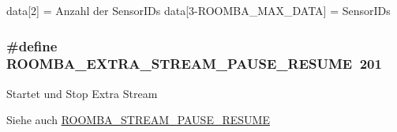 data\mbox{[}2\mbox{]} = Anzahl der Sensor\-I\-Ds data\mbox{[}3-\/\-R\-O\-O\-M\-B\-A\-\_\-\-M\-A\-X\-\_\-\-D\-A\-T\-A\mbox{]} = Sensor\-I\-Ds \hypertarget{group__roomba__commands__extra_ga0bea168edae0eebe638d2aa678c3f6e2}{
\subsubsection[{R\-O\-O\-M\-B\-A\-\_\-\-E\-X\-T\-R\-A\-\_\-\-S\-T\-R\-E\-A\-M\-\_\-\-P\-A\-U\-S\-E\-\_\-\-R\-E\-S\-U\-M\-E}]{\setlength{\rightskip}{0pt plus 5cm}\#define R\-O\-O\-M\-B\-A\-\_\-\-E\-X\-T\-R\-A\-\_\-\-S\-T\-R\-E\-A\-M\-\_\-\-P\-A\-U\-S\-E\-\_\-\-R\-E\-S\-U\-M\-E~201}}\label{group__roomba__commands__extra_ga0bea168edae0eebe638d2aa678c3f6e2}
Startet und Stop Extra Stream \begin{DoxySeeAlso}{Siehe auch}
\hyperlink{group__roomba__commands__sensor_ga6389061ebdb4feec1198ea5c4f6fae55}{R\-O\-O\-M\-B\-A\-\_\-\-S\-T\-R\-E\-A\-M\-\_\-\-P\-A\-U\-S\-E\-\_\-\-R\-E\-S\-U\-M\-E} 
\end{DoxySeeAlso}
